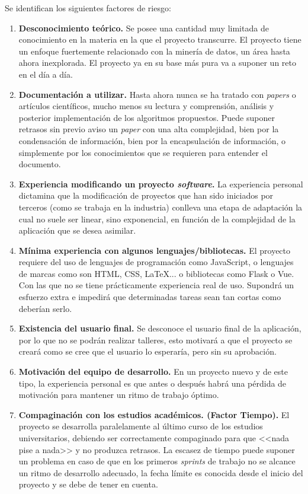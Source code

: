 Se identifican los siguientes factores de riesgo:
\begin{enumerate}
\item \textbf{Desconocimiento teórico.} Se posee una cantidad muy limitada de conocimiento en la materia en la que el proyecto transcurre. El proyecto tiene un enfoque fuertemente relacionado con la minería de datos, un área hasta ahora inexplorada. El proyecto ya en su base más pura va a suponer un reto en el día a día.
\item \textbf{Documentación a utilizar.} Hasta ahora nunca se ha tratado con \textit{papers} o artículos científicos, mucho menos su lectura y comprensión, análisis y posterior implementación de los algoritmos propuestos. Puede suponer retrasos sin previo aviso un \textit{paper} con una alta complejidad, bien por la condensación de información, bien por la encapsulación de información, o simplemente por los conocimientos que se  requieren para entender el documento.
\item \textbf{Experiencia modificando un proyecto \textit{software}.} La experiencia personal dictamina que la modificación de proyectos que han sido iniciados por terceros (como se trabaja en la industria) conlleva una etapa de adaptación la cual no suele ser linear, sino exponencial, en función de la complejidad de la aplicación que se desea asimilar.
\item \textbf{Mínima experiencia con algunos lenguajes/bibliotecas.} El proyecto requiere del uso de lenguajes de programación como JavaScript, o lenguajes de marcas como son HTML, CSS, \LaTeX ... o bibliotecas como Flask o Vue. Con las que no se tiene prácticamente experiencia real de uso. Supondrá un esfuerzo extra e impedirá que determinadas tareas sean tan cortas como deberían serlo.
\item \textbf{Existencia del usuario final.} Se desconoce el usuario final de la aplicación, por lo que no se podrán realizar talleres, esto motivará a que el proyecto se creará como se cree que el usuario lo esperaría, pero sin su aprobación.
\item \textbf{Motivación del equipo de desarrollo.} En un proyecto nuevo y de este tipo, la experiencia personal es que antes o después habrá una pérdida de motivación para mantener un ritmo de trabajo óptimo.
\item \textbf{Compaginación con los estudios académicos. (Factor Tiempo).} El proyecto se desarrolla paralelamente al último curso de los estudios universitarios, debiendo ser correctamente compaginado para que <<nada pise a nada>> y no produzca retrasos. La escasez de tiempo puede suponer un problema en caso de que en los primeros \textit{sprints} de trabajo no se alcance un ritmo de desarrollo adecuado, la fecha límite es conocida desde el inicio del proyecto y se debe de tener en cuenta.

\end{enumerate}
